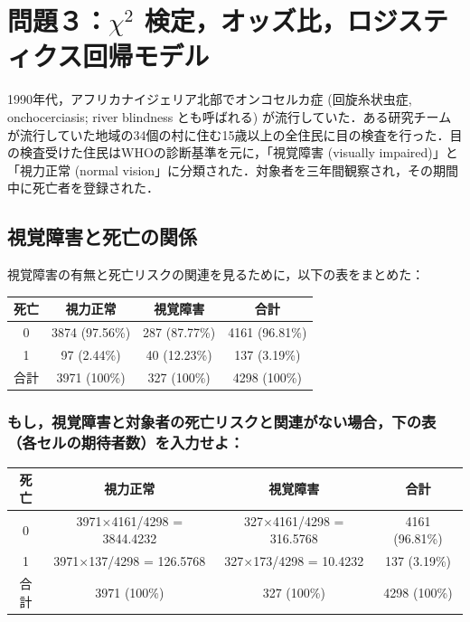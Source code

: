\documentclass[11pt,]{problemset}
\begin{document}
\hypertarget{chi2-}{%
\section{\texorpdfstring{問題３：\(\chi^2\)
検定，オッズ比，ロジスティクス回帰モデル}{問題３：\textbackslash{}chi\^{}2 検定，オッズ比，ロジスティクス回帰モデル}}\label{chi2-}}

1990年代，アフリカナイジェリア北部でオンコセルカ症 (回旋糸状虫症,
onchocerciasis; river blindness とも呼ばれる)
が流行していた．ある研究チームが流行していた地域の34個の村に住む15歳以上の全住民に目の検査を行った．目の検査受けた住民はWHOの診断基準を元に，「視覚障害
(visually impaired)」と「視力正常 (normal
vision」に分類された．対象者を三年間観察され，その期間中に死亡者を登録された．

\subsection{視覚障害と死亡の関係}

視覚障害の有無と死亡リスクの関連を見るために，以下の表をまとめた：

\begin{center}
\begin{tabular}{|c|c|c|c|}
\hline
死亡 & 視力正常           & 視覚障害          & 合計             \\ \hline
0  & 3874 (97.56\%) & 287 (87.77\%) & 4161 (96.81\%) \\ \hline
1  & 97 (2.44\%)    & 40 (12.23\%)  & 137 (3.19\%)   \\ \hline
合計 & 3971 (100\%)   & 327 (100\%)   & 4298 (100\%)   \\ \hline
\end{tabular}
\end{center}

\subsubsection{もし，視覚障害と対象者の死亡リスクと関連がない場合，下の表（各セルの期待者数）を入力せよ：}

\begin{center}
\begin{tabular}{|c|c|c|c|}
\hline
死亡 & 視力正常                     & 視覚障害                   & 合計             \\ \hline
0  & 3971$\times$4161/4298 = 3844.4232 & 327$\times$4161/4298 = 316.5768 & 4161 (96.81\%) \\ \hline
1  & 3971$\times$137/4298 = 126.5768   & 327$\times$173/4298 = 10.4232   & 137 (3.19\%)   \\ \hline
合計 & 3971 (100\%)             & 327 (100\%)            & 4298 (100\%)   \\ \hline
\end{tabular}
\end{center}
\end{document}
